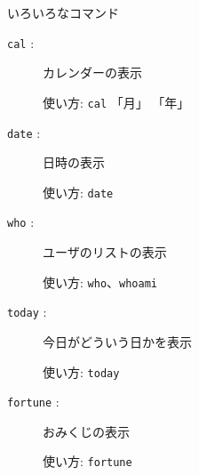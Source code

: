 \begin{center}
\begin{minipage}{13cm}
\begin{itembox}[l]{いろいろなコマンド}
\begin{description}
\item[\texttt{cal} :] カレンダーの表示

使い方: \texttt{cal} 「月」 「年」
\item[\texttt{date} :] 日時の表示

使い方: \texttt{date}
\item[\texttt{who} :] ユーザのリストの表示

使い方: \texttt{who}、\texttt{whoami}
\item[\texttt{today} :] 今日がどういう日かを表示

使い方: \texttt{today}
\item[\texttt{fortune} :] おみくじの表示

使い方: \texttt{fortune}
\end{description}
\end{itembox}
\end{minipage}
\end{center}

